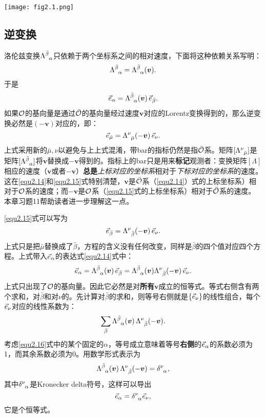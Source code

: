 {
    \centering
    \texttt{[image: fig2.1.png]}
    \label{fig2.1}
}



\subsection*{逆变换}
洛伦兹变换$\Lambda\indices{^{\bar{\beta}}_\alpha}$只依赖于两个坐标系之间的相对速度，下面将这种依赖关系写明：
\[
    \Lambda\indices{^{\bar{\beta}}_\alpha} = \Lambda\indices{^{\bar{\beta}}_\alpha} (\bm{v}).
\]
于是
\begin{equation}
    \Ve_\alpha = \Lambda\indices{^{\bar{\beta}}_\alpha} (\bm{v})\, \Ve_{\bar{\beta}}.
\label{equ2.14}
\end{equation}
如果$\mathcal{O}$的基向量是通过$\bar{\mathcal{O}}$的基向量经过速度$\bm{v}$对应的Lorentz变换得到的，那么逆变换必然是$(-\bm{v})$对应的，即：
\begin{equation}
    \Ve_{\bar{\mu}} = \Lambda\indices{^\nu_{\bar{\mu}}}(-\bm{v}) \, \Ve_\nu.
\label{equ2.15}
\end{equation}
上式采用新的$\bar{\mu}, \nu$以避免与上上式混淆，带bar的指标仍然是指$\bar{\mathcal{O}}$系。矩阵$[\Lambda\indices{^\nu_{\bar{\mu}}}]$是矩阵$[\Lambda\indices{^{\bar{\beta}}_\alpha}]$将$\bm{v}$替换成$-\bm{v}$得到的。指标上的bar只是用来\textbf{标记}观测者：变换矩阵$[\Lambda]$相应的速度（$\bm{v}$或者$-\bm{v}$）\textbf{总是}\textit{上标对应的坐标系}相对于\textit{下标对应的坐标系}的速度。这在\eqref{equ2.14}和\eqref{equ2.15}式特别清楚，$\bm{v}$是$\bar{\mathcal{O}}$系（\eqref{equ2.14}）式的上标坐标系）相对于$\mathcal{O}$系的速度；而$-\bm{v}$是$\mathcal{O}$系（\eqref{equ2.15}式的上标坐标系）相对于$\bar{\mathcal{O}}$系的速度。本章习题11帮助读者进一步理解这一点。

\eqref{equ2.15}式可以写为
\[
    \Ve_{\bar{\beta}} = \Lambda\indices{^\nu_{\bar{\beta}}}(-\bm{v}) \, \Ve_\nu.
\]
上式只是把$\bar{\mu}$替换成了$\bar{\beta}$，方程的含义没有任何改变，同样是$\bar{\beta}$的四个值对应四个方程。上式带入$\vec{e}_\alpha$的表达式\eqref{equ2.14}式中：
\begin{equation}
    \Ve_\alpha = \Lambda\indices{^{\bar{\beta}}_\alpha}(\bm{v}) \, \Ve_{\bar{\beta}} = \Lambda\indices{^{\bar{\beta}}_\alpha}(\bm{v}) \Lambda\indices{^\nu_{\bar{\beta}}}(-\bm{v}) \, \Ve_\nu.
\label{equ2.16}
\end{equation}
上式只出现了$\mathcal{O}$的基向量。因此它必然是对\textbf{所有}$\bm{v}$成立的恒等式。等式右侧含有两个求和，对$\bar{\beta}$和对$\nu$的。先计算对$\bar{\beta}$的求和，则等号右侧就是$\{ \vec{e}_\nu \}$的线性组合，每个$\vec{e}_\nu$对应的线性系数为：
\begin{equation}
    \sum_{\bar{\beta}} \Lambda\indices{^{\bar{\beta}}_\alpha}(\bm{v}) \, \Lambda\indices{^\nu_{\bar{\beta}}} (-\bm{v}).
\label{equ2.17}
\end{equation}
考虑\eqref{equ2.16}式中的某个固定的$\alpha$，等号成立意味着等号\textbf{右侧}的$\vec{e}_\alpha$的系数必须为1，而其余系数必须为0。用数学形式表示为
\[
    \Lambda\indices{^{\bar{\beta}}_\alpha}(\bm{v}) \, \Lambda\indices{^\nu_{\bar{\beta}}} (-\bm{v}) = \delta\indices{^\nu_\alpha},
\]
其中$\delta\indices{^\nu_\alpha}$是Kronecker delta符号，这样可以导出
\[
    \Ve_\alpha = \delta\indices{^\nu_\alpha} \Ve_\nu,
\]
它是个恒等式。

